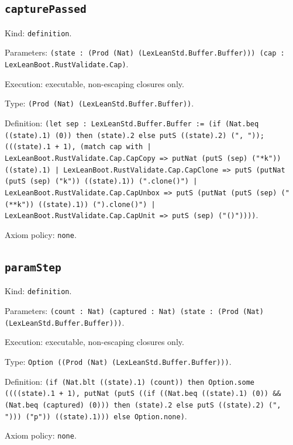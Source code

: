 \documentclass[11pt]{article}
\begin{document}
\subsection*{\texttt{capturePassed}}
\noindent Kind: \texttt{definition}.\par
\noindent Parameters: \texttt{(state : (Prod (Nat) (LexLeanStd.Buffer.Buffer))) (cap : LexLeanBoot.RustValidate.Cap)}.\par
\noindent Execution: executable, non-escaping closures only.\par
\noindent Type: \texttt{(Prod (Nat) (LexLeanStd.Buffer.Buffer))}.\par
\noindent Definition: \texttt{(let sep : LexLeanStd.Buffer.Buffer := (if (Nat.beq ((state).1) (0)) then (state).2 else putS ((state).2) (", ")); (((state).1 + 1), (match cap with | LexLeanBoot.RustValidate.Cap.CapCopy => putNat (putS (sep) ("*k")) ((state).1) | LexLeanBoot.RustValidate.Cap.CapClone => putS (putNat (putS (sep) ("k")) ((state).1)) (".clone()") | LexLeanBoot.RustValidate.Cap.CapUnbox => putS (putNat (putS (sep) ("(**k")) ((state).1)) (").clone()") | LexLeanBoot.RustValidate.Cap.CapUnit => putS (sep) ("()"))))}.\par
\noindent Axiom policy: \texttt{none}.\par
\subsection*{\texttt{paramStep}}
\noindent Kind: \texttt{definition}.\par
\noindent Parameters: \texttt{(count : Nat) (captured : Nat) (state : (Prod (Nat) (LexLeanStd.Buffer.Buffer)))}.\par
\noindent Execution: executable, non-escaping closures only.\par
\noindent Type: \texttt{Option ((Prod (Nat) (LexLeanStd.Buffer.Buffer)))}.\par
\noindent Definition: \texttt{(if (Nat.blt ((state).1) (count)) then Option.some ((((state).1 + 1), putNat (putS ((if ((Nat.beq ((state).1) (0)) \&\& (Nat.beq (captured) (0))) then (state).2 else putS ((state).2) (", "))) ("p")) ((state).1))) else Option.none)}.\par
\noindent Axiom policy: \texttt{none}.\par
\end{document}
